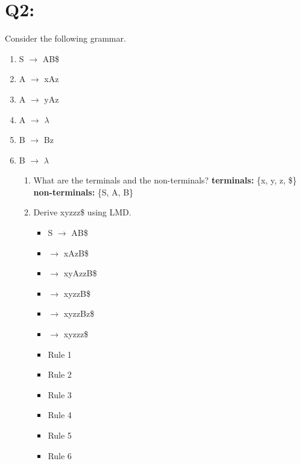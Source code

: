 \documentclass{report}
\begin{document}
\newpage
\section{Q2:}
\noindent Consider the following grammar.
\begin{enumerate}
  \item S $\rightarrow$ AB\$
  \item A $\rightarrow$ xAz
  \item A $\rightarrow$ yAz
  \item A $\rightarrow$ $\lambda$
  \item B $\rightarrow$ Bz
  \item B $\rightarrow$ $\lambda$
  \begin{enumerate}
    \item What are the terminals and the non-terminals?\newline
    \textbf{terminals:} \{x, y, z, \$\}\newline
    \textbf{non-terminals:} \{S, A, B\}\newline
    \item Derive xyzzz\$ using LMD.
    \vspace{-1em}
    \begin{multicols}{2}
      \begin{itemize}
        \setlength\itemsep{-.25em}
        \item[] S $\rightarrow$ AB\$
        \item[] \hspace{.9em}$\rightarrow$ xAzB\$
        \item[] \hspace{.9em}$\rightarrow$ xyAzzB\$
        \item[] \hspace{.9em}$\rightarrow$ xyzzB\$
        \item[] \hspace{.9em}$\rightarrow$ xyzzBz\$
        \item[] \hspace{.9em}$\rightarrow$ xyzzz\$
      \end{itemize}
      \begin{itemize}
        \setlength\itemsep{-.25em}
        \item[] Rule 1
        \item[] Rule 2
        \item[] Rule 3
        \item[] Rule 4
        \item[] Rule 5
        \item[] Rule 6

\end{itemize}
\end{multicols}
\end{enumerate}
\end{enumerate}
\end{document}
